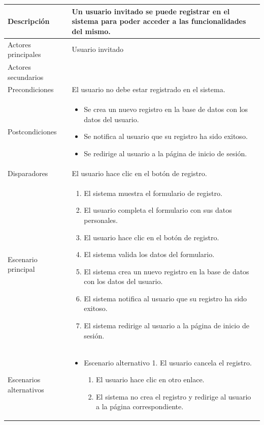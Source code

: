 \begin{longtable}{
>{\columncolor{lightgreen!20}}p{4cm}
p{12cm}
}
\midrule
Descripción & Un usuario invitado se puede registrar en el sistema para poder acceder a las funcionalidades del mismo. \\
\midrule
Actores principales & Usuario invitado \\
\midrule
Actores secundarios &  \\
\midrule
Precondiciones & El usuario no debe estar registrado en el sistema. \\
\midrule
Postcondiciones & \begin{itemize}[nosep,leftmargin=*]
  \item Se crea un nuevo registro en la base de datos con los datos del usuario.
  \item Se notifica al usuario que su registro ha sido exitoso.
  \item Se redirige al usuario a la página de inicio de sesión.
\end{itemize} \\
\midrule
Disparadores & El usuario hace clic en el botón de registro. \\
\midrule
Escenario principal & \begin{enumerate}[nosep,leftmargin=*]
  \item El sistema muestra el formulario de registro.
  \item El usuario completa el formulario con sus datos personales.
  \item El usuario hace clic en el botón de registro.
  \item El sistema valida los datos del formulario.
  \item El sistema crea un nuevo registro en la base de datos con los datos del usuario.
  \item El sistema notifica al usuario que su registro ha sido exitoso.
  \item El sistema redirige al usuario a la página de inicio de sesión.
\end{enumerate} \\
\midrule
Escenarios alternativos & 
\begin{itemize}[nosep,leftmargin=*]
  \item Escenario alternativo 1. El usuario cancela el registro.
  \begin{enumerate}[nosep,leftmargin=*]
      \item El usuario hace clic en otro enlace.
      \item El sistema no crea el registro y redirige al usuario a la página correspondiente.
  \end{enumerate}

\end{itemize}
\end{longtable}

